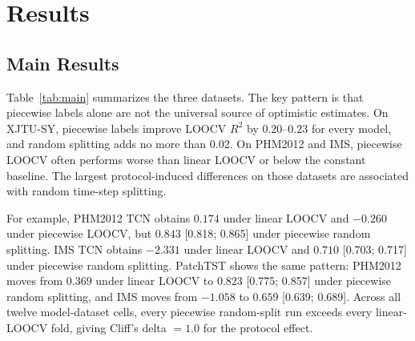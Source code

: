 \documentclass[pdflatex,sn-mathphys-num]{sn-jnl}
\begin{document}
\section{Results}
\subsection{Main Results}
Table~\ref{tab:main} summarizes the three datasets. The key pattern is that piecewise labels alone are not the universal source of optimistic estimates. On XJTU-SY, piecewise labels improve LOOCV $R^2$ by $0.20$--$0.23$ for every model, and random splitting adds no more than $0.02$. On PHM2012 and IMS, piecewise LOOCV often performs worse than linear LOOCV or below the constant baseline. The largest protocol-induced differences on those datasets are associated with random time-step splitting.

For example, PHM2012 TCN obtains $0.174$ under linear LOOCV and $-0.260$ under piecewise LOOCV, but $0.843$ [0.818; 0.865] under piecewise random splitting. IMS TCN obtains $-2.331$ under linear LOOCV and $0.710$ [0.703; 0.717] under piecewise random splitting. PatchTST shows the same pattern: PHM2012 moves from $0.369$ under linear LOOCV to $0.823$ [0.775; 0.857] under piecewise random splitting, and IMS moves from $-1.058$ to $0.659$ [0.639; 0.689]. Across all twelve model-dataset cells, every piecewise random-split run exceeds every linear-LOOCV fold, giving Cliff's delta $=1.0$ for the protocol effect.
\end{document}

